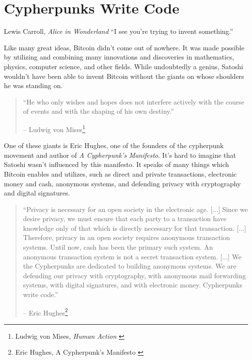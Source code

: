 \chapter{Cypherpunks Write Code}
\label{les:20}

\begin{chapquote}{Lewis Carroll, \textit{Alice in Wonderland}}
\enquote{I see you're trying to invent something.}
\end{chapquote}

Like many great ideas, Bitcoin didn't come out of nowhere. It was made
possible by utilizing and combining many innovations and discoveries in
mathematics, physics, computer science, and other fields. While
undoubtedly a genius, Satoshi wouldn't have been able to invent Bitcoin
without the giants on whose shoulders he was standing on.

\begin{quotation}\begin{samepage}
\enquote{He who only wishes and hopes does not interfere actively with the
course of events and with the shaping of his own destiny.}
\begin{flushright} -- Ludwig von Mises\footnote{Ludwig von Mises, \textit{Human Action} \cite{human-action}}
\end{flushright}\end{samepage}\end{quotation}

One of these giants is Eric Hughes, one of the founders of the cypherpunk
movement and author of \textit{A Cypherpunk's Manifesto}. It's hard to imagine
that Satoshi wasn't influenced by this manifesto. It speaks of many things which
Bitcoin enables and utilizes, such as direct and private transactions,
electronic money and cash, anonymous systems, and defending privacy with
cryptography and digital signatures.

\begin{quotation}\begin{samepage}
\enquote{Privacy is necessary for an open society in the electronic age.
[...] Since we desire privacy, we must ensure that each party to a
transaction have knowledge only of that which is directly necessary
for that transaction. [...]
Therefore, privacy in an open society requires anonymous transaction
systems. Until now, cash has been the primary such system. An
anonymous transaction system is not a secret transaction system.
[...]
We the Cypherpunks are dedicated to building anonymous systems. We are
defending our privacy with cryptography, with anonymous mail
forwarding systems, with digital signatures, and with electronic
money.
Cypherpunks write code.}
\begin{flushright} -- Eric Hughes\footnote{Eric Hughes, A Cypherpunk's Manifesto \cite{cypherpunk-manifesto}}
\end{flushright}\end{samepage}\end{quotation}

